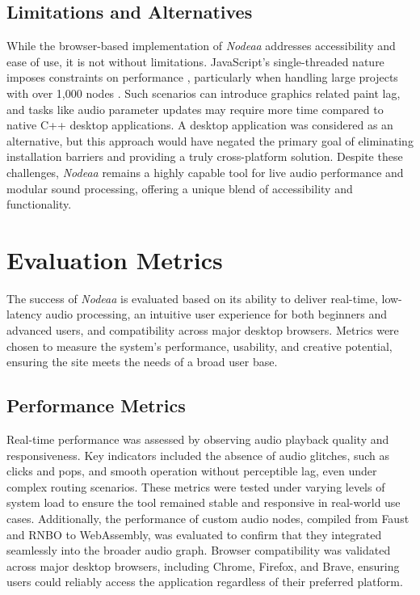 \documentclass[10pt,twocolumn]{article}
\begin{document}
\subsection{Limitations and Alternatives}
While the browser-based implementation of \textit{Nodeaa} addresses accessibility and ease of use, it is not without limitations. JavaScript's single-threaded nature imposes constraints on performance \cite{verdu2015performance}, particularly when handling large projects with over 1,000 nodes \cite{chkec2019performance}. Such scenarios can introduce graphics related paint lag, and tasks like audio parameter updates may require more time compared to native C++ desktop applications. A desktop application was considered as an alternative, but this approach would have negated the primary goal of eliminating installation barriers and providing a truly cross-platform solution. Despite these challenges, \textit{Nodeaa} remains a highly capable tool for live audio performance and modular sound processing, offering a unique blend of accessibility and functionality.

\section{Evaluation Metrics}

The success of \textit{Nodeaa} is evaluated based on its ability to deliver real-time, low-latency audio processing, an intuitive user experience for both beginners and advanced users, and compatibility across major desktop browsers. Metrics were chosen to measure the system’s performance, usability, and creative potential, ensuring the site meets the needs of a broad user base.

\subsection{Performance Metrics}
Real-time performance was assessed by observing audio playback quality and responsiveness. Key indicators included the absence of audio glitches, such as clicks and pops, and smooth operation without perceptible lag, even under complex routing scenarios. These metrics were tested under varying levels of system load to ensure the tool remained stable and responsive in real-world use cases. Additionally, the performance of custom audio nodes, compiled from Faust and RNBO to WebAssembly, was evaluated to confirm that they integrated seamlessly into the broader audio graph. Browser compatibility was validated across major desktop browsers, including Chrome, Firefox, and Brave, ensuring users could reliably access the application regardless of their preferred platform.
\end{document}
